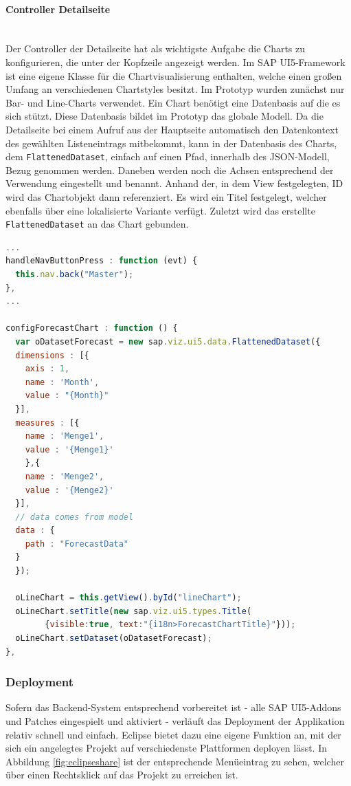 \paragraph{Controller Detailseite}$\;$ \\
Der Controller der Detailseite hat als wichtigste Aufgabe die Charts zu konfigurieren, die unter der Kopfzeile angezeigt werden. Im SAP UI5-Framework ist eine eigene Klasse für die Chartvisualisierung enthalten, welche einen großen Umfang an verschiedenen Chartstyles besitzt. Im Prototyp wurden zunächst nur Bar- und Line-Charts verwendet. Ein Chart benötigt eine Datenbasis auf die es sich stützt. Diese Datenbasis bildet im Prototyp das globale Modell. Da die Detailseite bei einem Aufruf aus der Hauptseite automatisch den Datenkontext des gewählten Listeneintrags mitbekommt, kann in der Datenbasis des Charts, dem \texttt{FlattenedDataset}, einfach auf einen Pfad, innerhalb des JSON-Modell, Bezug genommen werden. Daneben werden noch die Achsen entsprechend der Verwendung eingestellt und benannt. Anhand der, in dem View festgelegten, ID wird das Chartobjekt dann referenziert. Es wird ein Titel festgelegt, welcher ebenfalls über eine lokalisierte Variante verfügt. Zuletzt wird das erstellte \texttt{FlattenedDataset} an das Chart gebunden.

\vspace{1em}
\begin{lstlisting}[language=JavaScript, caption=Chart Konfigurierung, label=lst:chartconfig]
...
handleNavButtonPress : function (evt) {
  this.nav.back("Master");
},
...
	
configForecastChart : function () {
  var oDatasetForecast = new sap.viz.ui5.data.FlattenedDataset({
  dimensions : [{
    axis : 1,
    name : 'Month',
    value : "{Month}"
  }],
  measures : [{
    name : 'Menge1',
    value : '{Menge1}'
    },{
    name : 'Menge2',
    value : '{Menge2}'
  }],		
  // data comes from model
  data : {
    path : "ForecastData"
  }
  });

  oLineChart = this.getView().byId("lineChart");
  oLineChart.setTitle(new sap.viz.ui5.types.Title(
        {visible:true, text:"{i18n>ForecastChartTitle}"}));
  oLineChart.setDataset(oDatasetForecast);
},
\end{lstlisting}

\subsubsection{Deployment}
Sofern das Backend-System entsprechend vorbereitet ist - alle SAP UI5-Addons und Patches eingespielt und aktiviert - verläuft das Deployment der Applikation relativ schnell und einfach. Eclipse bietet dazu eine eigene Funktion an, mit der sich ein angelegtes Projekt auf verschiedenste Plattformen deployen lässt. In Abbildung \ref{fig:eclipseshare} ist der entsprechende Menüeintrag zu sehen, welcher über einen Rechtsklick auf das Projekt zu erreichen ist.

